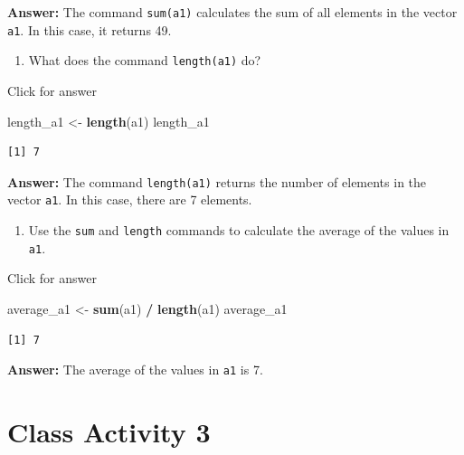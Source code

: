 \documentclass[
]{book}
\newenvironment{Shaded}{\begin{snugshade}}{\end{snugshade}}
\newcommand{\FunctionTok}[1]{\textcolor[rgb]{0.13,0.29,0.53}{\textbf{#1}}}
\newcommand{\NormalTok}[1]{#1}
\newcommand{\OtherTok}[1]{\textcolor[rgb]{0.56,0.35,0.01}{#1}}
\newcommand{\SpecialCharTok}[1]{\textcolor[rgb]{0.81,0.36,0.00}{\textbf{#1}}}
\providecommand{\tightlist}{%
  \setlength{\itemsep}{0pt}\setlength{\parskip}{0pt}}
\begin{document}
\textbf{Answer:} The command \texttt{sum(a1)} calculates the sum of all elements in the vector \texttt{a1}. In this case, it returns 49.

\begin{enumerate}
\def\labelenumi{\alph{enumi}.}
\setcounter{enumi}{4}
\tightlist
\item
  What does the command \texttt{length(a1)} do?
\end{enumerate}

Click for answer

\begin{Shaded}
\begin{Highlighting}[]
\NormalTok{length\_a1 }\OtherTok{\textless{}{-}} \FunctionTok{length}\NormalTok{(a1)}
\NormalTok{length\_a1}
\end{Highlighting}
\end{Shaded}

\begin{verbatim}
[1] 7
\end{verbatim}

\textbf{Answer:} The command \texttt{length(a1)} returns the number of elements in the vector \texttt{a1}. In this case, there are 7 elements.

\begin{enumerate}
\def\labelenumi{\alph{enumi}.}
\setcounter{enumi}{5}
\tightlist
\item
  Use the \texttt{sum} and \texttt{length} commands to calculate the average of the values in \texttt{a1}.
\end{enumerate}

Click for answer

\begin{Shaded}
\begin{Highlighting}[]
\NormalTok{average\_a1 }\OtherTok{\textless{}{-}} \FunctionTok{sum}\NormalTok{(a1) }\SpecialCharTok{/} \FunctionTok{length}\NormalTok{(a1)}
\NormalTok{average\_a1}
\end{Highlighting}
\end{Shaded}

\begin{verbatim}
[1] 7
\end{verbatim}

\textbf{Answer:} The average of the values in \texttt{a1} is 7.

\hypertarget{class-activity-3}{%
\chapter{Class Activity 3}\label{class-activity-3}}
\end{document}
